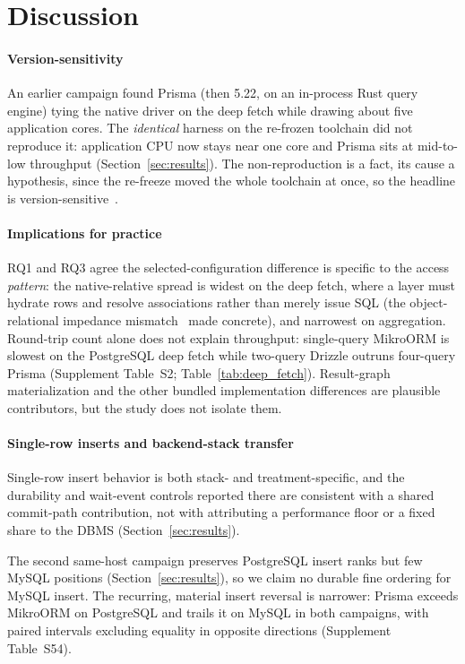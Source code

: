 \section{Discussion}
\label{sec:discussion}

\paragraph{Version-sensitivity}
An earlier campaign found Prisma (then 5.22, on an in-process Rust query engine) tying the native
driver on the deep fetch while drawing about five application cores. The \emph{identical} harness on
the re-frozen toolchain did not reproduce it: application CPU now stays near one core and Prisma sits
at mid-to-low throughput (Section~\ref{sec:results}). The non-reproduction is a fact, its cause a
hypothesis, since the re-freeze moved the whole toolchain at once, so the headline is
version-sensitive~\cite{vanzyl2009optimisations}.

\paragraph{Implications for practice}
RQ1 and RQ3 agree the selected-configuration difference is specific to the access \emph{pattern}:
the native-relative spread is widest on the deep fetch, where a layer must hydrate rows and resolve
associations rather than merely issue SQL (the object-relational impedance
mismatch~\cite{ireland2009impedance} made concrete), and narrowest on aggregation. Round-trip count
alone does not explain throughput: single-query MikroORM is slowest on the PostgreSQL deep fetch
while two-query Drizzle outruns four-query Prisma (Supplement Table~S2;
Table~\ref{tab:deep_fetch}). Result-graph materialization and the other bundled implementation
differences are plausible contributors, but the study does not isolate them.

\paragraph{Single-row inserts and backend-stack transfer}
Single-row insert behavior is both stack- and treatment-specific, and the durability and wait-event
controls reported there are consistent with a shared commit-path contribution, not with attributing
a performance floor or a fixed share to the DBMS (Section~\ref{sec:results}).

The second same-host campaign preserves PostgreSQL insert ranks but few MySQL positions
(Section~\ref{sec:results}), so we claim no durable fine ordering for MySQL insert. The recurring, material insert reversal
is narrower: Prisma exceeds MikroORM on PostgreSQL and trails it on MySQL in both
campaigns, with paired intervals excluding equality in opposite directions
(Supplement Table~S54).

